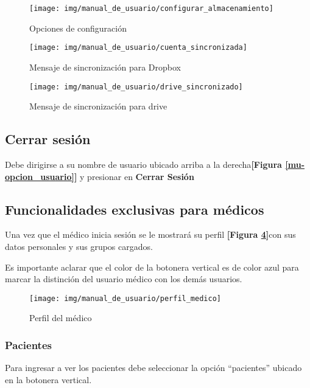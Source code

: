\begin{figure}
	\centering
	\texttt{[image: img/manual\_de\_usuario/configurar\_almacenamiento]}
	\caption{Opciones de configuración}
	\label{mu-configurar_almacenamiento}
\end{figure}
\begin{figure}
	\centering
	\texttt{[image: img/manual\_de\_usuario/cuenta\_sincronizada]}
	\caption{Mensaje de sincronización para Dropbox}
	\label{mu-cuenta_sincronizada}
\end{figure}
\begin{figure}
	\centering
	\texttt{[image: img/manual\_de\_usuario/drive\_sincronizado]}
	\caption{Mensaje de sincronización para drive}
	\label{drive_sincronizado}
\end{figure}

\subsection{Cerrar sesión}
Debe dirigirse a su nombre de usuario ubicado arriba a la derecha\textbf{[Figura \ref{mu-opcion_usuario}]} y presionar en \textbf{Cerrar Sesión}



\subsection{Funcionalidades exclusivas para médicos}
\label{manual_para_medico}
\begin{sloppypar}
	Una vez que el médico inicia sesión se le mostrará su perfil \textbf{[Figura \ref{perfil_medico}]}con sus datos personales y sus grupos cargados. 
	
	Es importante aclarar que el color de la botonera vertical es de color azul para marcar la distinción del usuario médico con los demás usuarios. 
	
	\begin{figure}
		\centering
		\texttt{[image: img/manual\_de\_usuario/perfil\_medico]}
		\caption{Perfil del médico}
		\label{perfil_medico}
	\end{figure}
\end{sloppypar}



\subsubsection{Pacientes}

Para ingresar a ver los pacientes debe seleccionar la opción ``pacientes'' ubicado en la botonera vertical.

